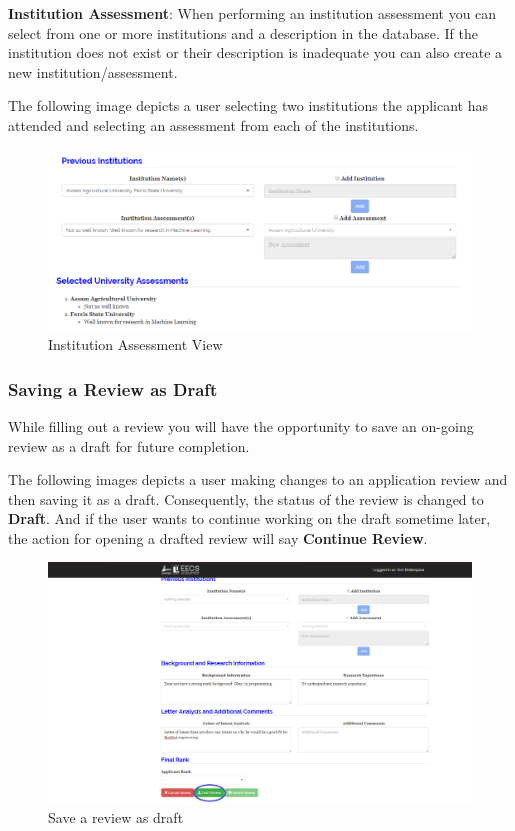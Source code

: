\documentclass[fontsize=12pt,paper=letter,twoside]{scrartcl}
\begin{document}
\bigskip
\noindent \textbf{Institution Assessment}: When performing an institution assessment you can select from one or more institutions and a description in the database. If the institution does not exist or their description is inadequate you can also create a new institution/assessment.

\bigskip
\noindent The following image depicts a user selecting two institutions the applicant has attended and selecting an assessment from each of the institutions.

\begin{figure}[!htb]
\begin{center}
\includegraphics[width=.7\textwidth]{images/cm/uni_assessment.png}
\end{center}
\caption{Institution Assessment View}
\label{fig:cm:uni_assessment}
\end{figure}

\clearpage
\newpage
\subsubsection{Saving a Review as Draft}
While filling out a review you will have the opportunity to save an on-going review as a draft for future completion.

\bigskip
\noindent The following images depicts a user making changes to an application review and then saving it as a draft. Consequently, the status of the review is changed to \textbf{Draft}. And if the user wants to continue working on the draft sometime later, the action for opening a drafted review will say \textbf{Continue Review}.

\begin{figure}[!htb]
\begin{center}
\includegraphics[width=.9\textwidth]{images/cm/save_as_draft_review.png}
\end{center}
\caption{Save a review as draft}
\label{fig:cm:save_as_draft_review}
\end{figure}
\end{document}
